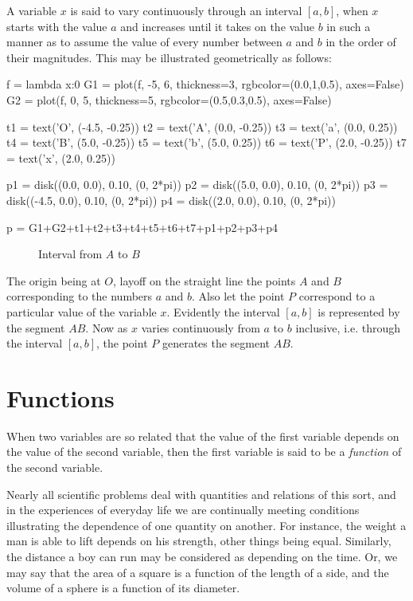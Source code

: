 A variable $x$ is said to vary continuously through an interval $\left \lbrack
a, b \right \rbrack$, when $x$ starts with the value $a$ and increases until it
takes on the value $b$ in such a manner as to assume the value of every number
between $a$ and $b$ in the order of their magnitudes. This may be illustrated
geometrically as follows:

\begin{sagesilent}
f = lambda x:0
G1 = plot(f, -5, 6, thickness=3, rgbcolor=(0.0,1,0.5), axes=False)
G2 = plot(f, 0, 5, thickness=5, rgbcolor=(0.5,0.3,0.5), axes=False)

t1 = text('O', (-4.5, -0.25))
t2 = text('A', (0.0, -0.25))
t3 = text('a', (0.0, 0.25))
t4 = text('B', (5.0, -0.25))
t5 = text('b', (5.0, 0.25))
t6 = text('P', (2.0, -0.25))
t7 = text('x', (2.0, 0.25))

p1 = disk((0.0, 0.0), 0.10, (0, 2*pi))
p2 = disk((5.0, 0.0), 0.10, (0, 2*pi))
p3 = disk((-4.5, 0.0), 0.10, (0, 2*pi))
p4 = disk((2.0, 0.0), 0.10, (0, 2*pi))

p = G1+G2+t1+t2+t3+t4+t5+t6+t7+p1+p2+p3+p4
\end{sagesilent}

\begin{figure}[h]
\begin{center}
\end{center}
\caption{Interval from $A$ to $B$}
\label{fig:02:01}
\end{figure}

The origin being at $O$, layoff on the straight line the points 
$A$ and $B$ corresponding to the numbers $a$ and $b$. Also 
let the point $P$ correspond to a particular value of the variable $x$. 
Evidently the interval $\left \lbrack a, b \right \rbrack$ is 
represented by the segment $AB$. Now as $x$ varies continuously 
from $a$ to $b$ inclusive, i.e. through the interval 
$\left \lbrack a, b \right \rbrack$, the point $P$ 
generates the segment $AB$.

\section{Functions}
\label{sec:02:04}

When two variables are so related that the value of the first variable
depends on the value of the second variable, then the first variable is
said to be a \emph{function} of the second variable.

Nearly all scientific problems deal with quantities and relations of this sort,
and in the experiences of everyday life we are continually meeting conditions
illustrating the dependence of one quantity on another. For instance, the
weight a man is able to lift depends on his strength, other things being equal.
Similarly, the distance a boy can run may be considered as depending on the
time. Or, we may say that the area of a square is a function of the length of a
side, and the volume of a sphere is a function of its diameter.

